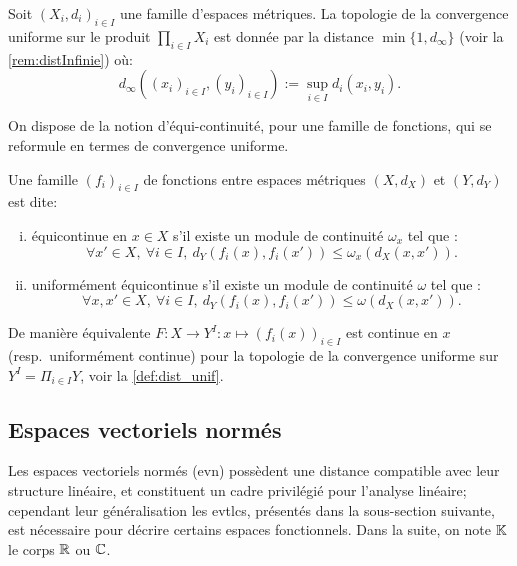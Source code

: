 \begin{definition}
\label{def:dist_unif}
%
	Soit $(X_i,d_i)_{i \in I}$ une famille d'espaces métriques. La topologie de la convergence uniforme sur le produit $\prod_{i \in I} X_i$ est donnée par la distance $\min\{1,d_\infty\}$ (voir la \cref{rem:distInfinie}) où:
	\begin{equation*}
		d_\infty( (x_i)_{i \in I}, (y_i)_{i \in I} ) := \sup_{i \in I} d_i(x_i,y_i).
	\end{equation*}
\end{definition}

On dispose de la notion d'équi-continuité, pour une famille de fonctions, qui se reformule en termes de convergence uniforme.

\begin{remark}[Équicontinuité]
\label{rem:equicont}
%
Une famille $(f_i)_{i \in I}$ de fonctions entre espaces métriques $(X,d_X)$ et $(Y,d_Y)$ est dite:
\begin{enumerate}[(i)]
	\item équicontinue en $x \in X$ s'il existe un module de continuité $\omega_x$ tel que : 
	\begin{equation*}
	\forall x' \in X,\ \forall i \in I,\ d_Y(f_i(x),f_i(x')) \leq \omega_x(d_X(x,x')). 		
	\end{equation*}
	\item uniformément équicontinue s'il existe un module de continuité $\omega$ tel que :
	\begin{equation*}
	\forall x,x' \in X,\ \forall i \in I,\ d_Y(f_i(x),f_i(x')) \leq \omega(d_X(x,x')). 		
	\end{equation*}
\end{enumerate}
De manière équivalente $F : X \to Y^I : x \mapsto (f_i(x))_{i \in I}$ est continue en $x$ (resp.\ uniformément continue) pour la topologie de la convergence uniforme sur $Y^I = \Pi_{i \in I} Y$, voir la \cref{def:dist_unif}. 
\end{remark}


\subsection{Espaces vectoriels normés}
\label{subsec:evn}

Les espaces vectoriels normés (evn) possèdent une distance compatible avec leur structure linéaire, et constituent un cadre privilégié pour l'analyse linéaire; cependant leur généralisation les evtlcs, présentés dans la sous-section suivante, est nécessaire pour décrire certains espaces fonctionnels. 
Dans la suite, on note $\mathbb{K}$ le corps $\mathbb{R}$ ou $\mathbb{C}$. 


